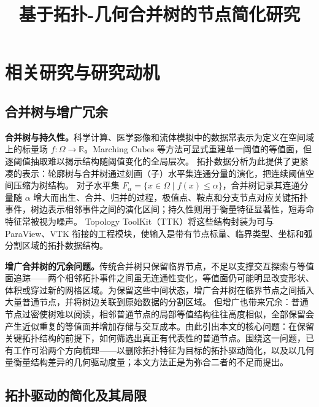 \documentclass[twocolumn, a4paper, 10pt]{article}
\title{\textbf{基于拓扑-几何合并树的节点简化研究}}
\author{}
\date{}
\begin{document}
\raggedbottom
\sloppy
\setlength{\emergencystretch}{2em}
\setlength{\parindent}{2em}
\setlength{\parskip}{0pt}

\maketitle

\setcounter{section}{1}

\section{相关研究与研究动机}

\subsection{合并树与增广冗余}

\textbf{合并树与持久性。}科学计算、医学影像和流体模拟中的数据常表示为定义在空间域上的标量场 $f:\Omega\rightarrow\mathbb{R}$。Marching Cubes 等方法可显式重建单一阈值的等值面，但逐阈值抽取难以揭示结构随阈值变化的全局层次。\cite{lorensen_cline_1987} 拓扑数据分析为此提供了更紧凑的表示：轮廓树与合并树通过刻画（子）水平集连通分量的演化，把连续阈值空间压缩为树结构。\cite{van_kreveld_1997,carr_contour_2003} 对子水平集 $F_\alpha=\{x\in\Omega\mid f(x)\leq\alpha\}$，合并树记录其连通分量随 $\alpha$ 增大而出生、合并、归并的过程，极值点、鞍点和分支节点对应关键拓扑事件，树边表示相邻事件之间的演化区间；持久性则用于衡量特征显著性，短寿命特征常被视为噪声。\cite{edelsbrunner_persistence_2002} Topology ToolKit（TTK）将这些结构封装为可与 ParaView、VTK 衔接的工程模块，使输入是带有节点标量、临界类型、坐标和弧分割区域的拓扑数据结构。\cite{tierny_ttk_2018}

\textbf{增广合并树的冗余问题。}传统合并树只保留临界节点，不足以支撑交互探索与等值面追踪——两个相邻拓扑事件之间虽无连通性变化，等值面仍可能明显改变形状、体积或穿过新的网格区域。为保留这些中间状态，增广合并树在临界节点之间插入大量普通节点，并将树边关联到原始数据的分割区域。\cite{gueunet_amt_2017,koepp_temporal_2023,li_distributed_2024} 但增广也带来冗余：普通节点过密使树难以阅读，相邻普通节点的局部等值结构往往高度相似，全部保留会产生近似重复的等值面并增加存储与交互成本。由此引出本文的核心问题：在保留关键拓扑结构的前提下，如何筛选出真正有代表性的普通节点。围绕这一问题，已有工作可沿两个方向梳理——以删除拓扑特征为目标的拓扑驱动简化，以及以几何量衡量结构差异的几何驱动度量；本文方法正是为弥合二者的不足而提出。

\subsection{拓扑驱动的简化及其局限}
\end{document}
